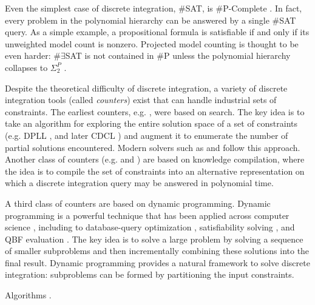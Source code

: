 Even the simplest case of discrete integration, \#SAT, is \#P-Complete \cite{Valiant79}. 
In fact, every problem in the polynomial hierarchy can be answered by a single \#SAT query. %
As a simple example, a propositional formula is satisfiable if and only if its unweighted model count is nonzero.
Projected model counting is thought to be even harder: $\#\exists$SAT is not contained in $\#$P unless the polynomial hierarchy collapses to $\Sigma_2^P$ \cite{zawadzki2013generalization}.

Despite the theoretical difficulty of discrete integration, a variety of discrete integration tools (called \emph{counters}) exist that can handle industrial sets of constraints. The earliest counters, e.g.  \cite{birnbaum1999good}, were based on search.
The key idea is to take an algorithm for exploring the entire solution space of a set of constraints (e.g. DPLL \cite{davis1960computing,davis1962machine}, and later CDCL \cite{biere2009conflict}) and augment it to enumerate the number of partial solutions encountered. 
Modern solvers such as  \cite{SBK05} and  \cite{Thurley2006} follow this approach.
Another class of counters (e.g.  \cite{OD15} and  \cite{LM17}) are based on knowledge compilation, where the idea is to compile the set of constraints into an alternative representation on which a discrete integration query may be answered in polynomial time.

A third class of counters \cite{CW16,FHMW17,FHWZ18,FHZ19,DPV20,fichte2020exploiting} are based on dynamic programming. %
Dynamic programming is a powerful technique that has been applied across computer science \cite{bellman1966dynamic}, including to database-query optimization \cite{MPPV04}, satisfiability solving \cite{uribe1994ordered,aguirre2001random,pan2005symbolic}, and QBF evaluation \cite{charwat2016bdd}.
The key idea is to solve a large problem by solving a sequence of smaller subproblems and then incrementally combining these solutions into the final result.
Dynamic programming provides a natural framework to solve discrete integration: subproblems can be formed by partitioning the input constraints.


Algorithms \cite{FMR08,SS10}.





